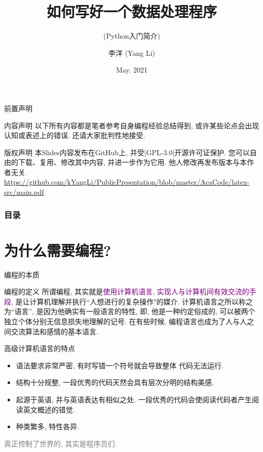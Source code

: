 \documentclass{beamer}
\title[CMT.Tsinghua]{如何写好一个数据处理程序}
\subtitle{(Python入门简介)}
\author[Yang Li]{
  李洋 (Yang Li)\inst{1}}
\institute[Physics@Tsinghua]{
  \inst{1} Department of Physics\\
           Tsinghua University 
}
\date[Tsinghua Physics 2021]{May. 2021}
\newcommand{\purple}{\textcolor{purple}}
\begin{document}
  \frame{\titlepage}

  \begin{frame}[fragile]{前置声明}
    \begin{block}{内容声明}
      以下所有内容都是笔者参考自身编程经验总结得到, 或许某些论点会出现认知或表述上的错误. 还请大家批判性地接受.
    \end{block}
    \begin{block}{版权声明}
      本Slides内容发布在GitHub上, 并受\cverb|GPL-3.0|开源许可证保护. 您可以自由的下载、复用、修改其中内容, 并进一步作为它用. 他人修改再发布版本与本作者无关.\\
      {\tiny \purple{\url{https://github.com/kYangLi/PublicPresentation/blob/master/AcaCode/latex-src/main.pdf}}}
    \end{block}
  \end{frame}

  \begin{frame}
    \frametitle{目录}
    \tableofcontents
  \end{frame}

  \section{为什么需要编程?}
    \begin{frame}{编程的本质}
      \begin{block}{编程的定义}
        所谓编程, 其实就是\purple{使用计算机语言, 实现人与计算机间有效交流的手段}, 是让计算机理解并执行``人想进行的复杂操作"的媒介. 计算机语言之所以称之为``语言'', 是因为他确实有一般语言的特性, 即, 他是一种约定俗成的, 可以被两个独立个体分别无信息损失地理解的记号. 在有些时候, 编程语言也成为了人与人之间交流算法和感情的基本语言.
      \end{block}
      \begin{block}{高级计算机语言的特点}
        \begin{itemize}
          \item 语法要求非常严密, 有时写错一个符号就会导致整体 代码无法运行.
          \item 结构十分规整, 一段优秀的代码天然会具有层次分明的结构美感.
          \item 起源于英语, 并与英语表达有相似之处. 一段优秀的代码会使阅读代码者产生阅读英文概述的错觉.
          \item 种类繁多, 特性各异.
        \end{itemize}
      \end{block}
      \textcolor{gray}{真正控制了世界的, 其实是程序员们.}
    \end{frame}
\end{document}
